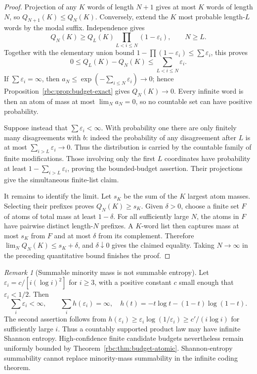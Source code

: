 \documentclass[11pt]{article}
\numberwithin{equation}{section}
\theoremstyle{definition}
\theoremstyle{remark}
\newtheorem{remark}[theorem]{Remark}
\begin{document}
\begin{proof}
Projection of any $K$ words of length $N+1$ gives at most $K$ words of
length $N$, so $Q_{N+1}(K)\le Q_N(K)$.  Conversely, extend the $K$ most
probable length-$L$ words by the modal suffix.  Independence gives
\[
 Q_N(K)\ge Q_L(K)\prod_{L<i\le N}(1-\varepsilon_i),\qquad N\ge L.
\]
Together with the elementary union bound
$1-\prod(1-\varepsilon_i)\le\sum\varepsilon_i$, this proves
\[
 0\le Q_L(K)-Q_N(K)\le\sum_{L<i\le N}\varepsilon_i.
\]
If $\sum\varepsilon_i=\infty$, then
$a_N\le\exp(-\sum_{i\le N}\varepsilon_i)\to0$; hence
Proposition~\ref{rbc:prop:budget-exact} gives $Q_N(K)\to0$.
Every infinite word is then an atom of mass at most $\lim_Na_N=0$,
so no countable set can have positive probability.

Suppose instead that $\sum\varepsilon_i<\infty$.  With probability one
there are only finitely many disagreements with $b$: indeed the probability
of any disagreement after $L$ is at most $\sum_{i>L}\varepsilon_i\to0$.
Thus the distribution is carried by the countable family of finite
modifications.  Those involving only the first $L$ coordinates have
probability at least $1-\sum_{i>L}\varepsilon_i$, proving the bounded-budget
assertion.  Their projections give the simultaneous finite-list claim.

It remains to identify the limit.  Let $s_K$ be the sum of the $K$ largest
atom masses.  Selecting their prefixes proves $Q_N(K)\ge s_K$.
Given $\delta>0$, choose a finite set $F$ of atoms of total mass at least
$1-\delta$.  For all sufficiently large $N$, the atoms in $F$ have
pairwise distinct length-$N$ prefixes.  A $K$-word list then captures
mass at most $s_K$ from $F$ and at most $\delta$ from its complement.
Therefore $\lim_N Q_N(K)\le s_K+\delta$, and $\delta\downarrow0$ gives
the claimed equality.  Taking $N\to\infty$ in the preceding quantitative
bound finishes the proof.
\end{proof}

\begin{remark}[Summable minority mass is not summable entropy]
Let $\varepsilon_i=c/[i(\log i)^2]$ for $i\ge3$, with a positive constant
$c$ small enough that $\varepsilon_i<1/2$.  Then
\[
 \sum_i\varepsilon_i<\infty,
 \qquad
 \sum_i h(\varepsilon_i)=\infty,
 \quad h(t)=-t\log t-(1-t)\log(1-t).
\]
The second assertion follows from
$h(\varepsilon_i)\ge\varepsilon_i\log(1/\varepsilon_i)
\ge c'/(i\log i)$ for sufficiently large $i$.
Thus a countably supported product law may have infinite Shannon entropy.
High-confidence finite candidate budgets nevertheless remain uniformly
bounded by Theorem~\ref{rbc:thm:budget-atomic}.  Shannon-entropy summability
cannot replace minority-mass summability in the infinite coding theorem.
\end{remark}
\end{document}
